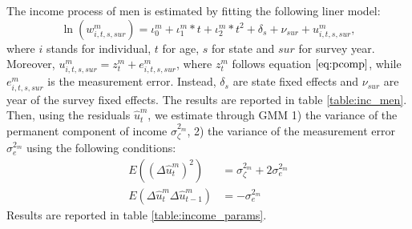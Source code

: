 \documentclass[12pt]{article}
\numberwithin{table}{section}
\begin{document}
The income process of men is estimated by fitting the following liner model:
\begin{equation}\label{eq:male_earn}
\ln(w^m_{i,t,s,sur})=\iota^m_0+\iota^m_1*t+\iota^m_2*t^2+\delta_s+\nu_{sur}+u_{i,t,s,sur}^m,
\end{equation}
where $i$ stands for individual, $t$ for age, $s$ for state and $sur$ for survey year. Moreover, $u_{i,t,s,sur}^m=z_t^m+e^m_{i,t,s,sur}$, where $z_t^m$ follows equation $\ref{eq:pcomp}$, while $e^m_{i,t,s,sur}$ is the measurement error. Instead, $\delta_s$ are state fixed effects and $\nu_{sur}$ are year of the survey fixed effects. The results are reported in table \ref{table:inc_men}. Then, using the residuals  $\hat{u}_{t}^m$, we estimate through GMM  1) the variance of the permanent component of income $\sigma_\zeta^{2_m}$, 2) the variance of the measurement error $\sigma_e^{2_m}$ using the following conditions:
\begin{equation}\label{eq:male_gmm}
\begin{split}
E((\Delta\hat{u}_{t}^m)^2)&=\sigma_\zeta^{2_m}+2\sigma_e^{2_m}\\
E(\Delta\hat{u}_{t}^m\Delta\hat{u}_{t-1}^m)&=-\sigma_e^{2_m}
\end{split}
\end{equation}
Results are reported in table \ref{table:income_params}.
\end{document}

